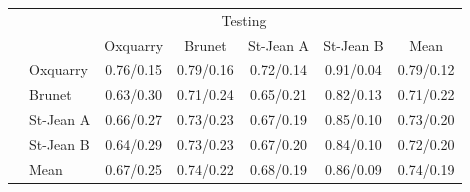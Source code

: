 \begin{table*}
  \vspace{0.5cm}

  \begin{tabular}{l l| c c c c|c}
    \toprule
    \multicolumn{2}{c}{\multirow{2}{*}{}} & \multicolumn{4}{c}{Testing} \\
    \multicolumn{2}{c}{} & Oxquarry & Brunet & St-Jean A & St-Jean B & Mean \\
    \midrule
    \parbox[t]{2mm}{}
    & Oxquarry  & 0.76/0.15 & 0.79/0.16 & 0.72/0.14 & 0.91/0.04 & 0.79/0.12 \\
    & Brunet    & 0.63/0.30 & 0.71/0.24 & 0.65/0.21 & 0.82/0.13 & 0.71/0.22 \\
    & St-Jean A & 0.66/0.27 & 0.73/0.23 & 0.67/0.19 & 0.85/0.10 & 0.73/0.20 \\
    & St-Jean B & 0.64/0.29 & 0.73/0.23 & 0.67/0.20 & 0.84/0.10 & 0.72/0.20 \\
    \midrule
    & Mean      & 0.67/0.25 & 0.74/0.22 & 0.68/0.19 & 0.86/0.09 & 0.74/0.19 \\
    \bottomrule
  \end{tabular}
\end{table*}
